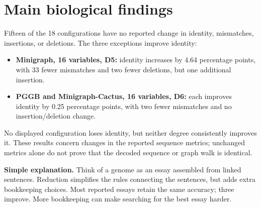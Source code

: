 \documentclass[10pt,letterpaper]{article}
\begin{document}
\section*{Main biological findings}
Fifteen of the 18 configurations have no reported change in identity,
mismatches, insertions, or deletions. The three exceptions improve identity:
\begin{itemize}
\setlength{\itemsep}{0pt}
\item \textbf{Minigraph, 16 variables, D5:} identity increases by 4.64 percentage
points, with 33 fewer mismatches and two fewer deletions, but one additional insertion.
\item \textbf{PGGB and Minigraph-Cactus, 16 variables, D6:} each improves identity
by 0.25 percentage points, with two fewer mismatches and no insertion/deletion change.
\end{itemize}
No displayed configuration loses identity, but neither degree consistently
improves it. These results concern changes in the reported sequence metrics;
unchanged metrics alone do not prove that the decoded sequence or graph walk is identical.

\textbf{Simple explanation.}
Think of a genome as an essay assembled from linked sentences. Reduction
simplifies the rules connecting the sentences, but adds extra bookkeeping
choices. Most reported essays retain the same accuracy; three improve.
More bookkeeping can make searching for the best essay harder.

\newpage
\end{document}
